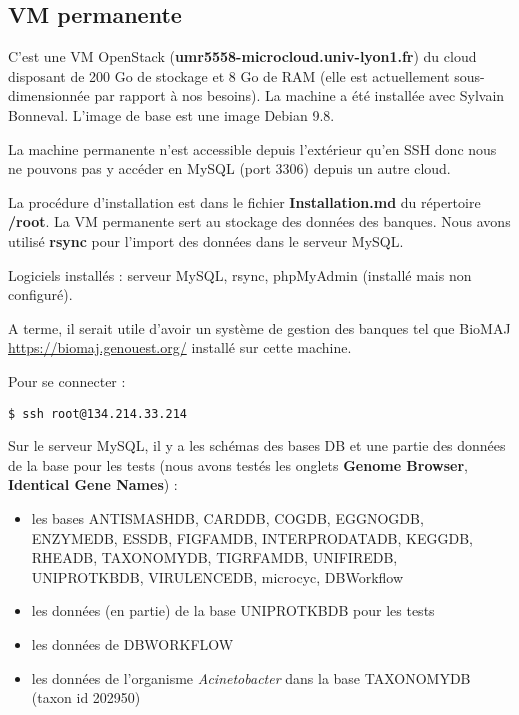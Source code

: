 \subsection {VM permanente}\label{VMpermanente}

C'est une VM OpenStack (\textbf{umr5558-microcloud.univ-lyon1.fr}) du cloud  disposant de 200 Go de stockage et 8 Go de RAM (elle est actuellement sous-dimensionnée par rapport à nos besoins). La machine a été installée avec Sylvain Bonneval. L'image de base est une image Debian 9.8.

La machine permanente n'est accessible depuis l'extérieur qu'en SSH donc nous ne pouvons pas y accéder en MySQL (port 3306) depuis un autre cloud.
\newline

La procédure d'installation est dans le fichier \textbf{Installation.md} du répertoire \textbf{/root}. La VM permanente sert au stockage des données des banques. Nous avons utilisé \textbf{rsync} pour l'import des données dans le serveur MySQL.
\newline

Logiciels installés : serveur MySQL, rsync, phpMyAdmin (installé mais non configuré). 
\newline

A terme, il serait utile d'avoir un système de gestion des banques tel que BioMAJ \url{https://biomaj.genouest.org/} installé sur cette machine.

Pour se connecter : 
\begin{lstlisting}[style=bash]
$ ssh root@134.214.33.214
\end{lstlisting}
\bigskip

Sur le serveur MySQL, il y a les schémas des bases DB et une partie des données de la base pour les tests (nous avons testés les onglets \textbf{Genome Browser}, \textbf{Identical Gene Names}) :
\begin{itemize}
	\item les bases ANTISMASHDB, CARDDB, COGDB, EGGNOGDB, ENZYMEDB, ESSDB, FIGFAMDB, INTERPRODATADB, KEGGDB, RHEADB, TAXONOMYDB, TIGRFAMDB, UNIFIREDB, UNIPROTKBDB, VIRULENCEDB, microcyc, DBWorkflow
	\item les données (en partie) de la base UNIPROTKBDB pour les tests
	\item les données de DBWORKFLOW
	\item les données de l'organisme \textit{Acinetobacter} dans la base TAXONOMYDB (taxon id 202950)
\end{itemize}

